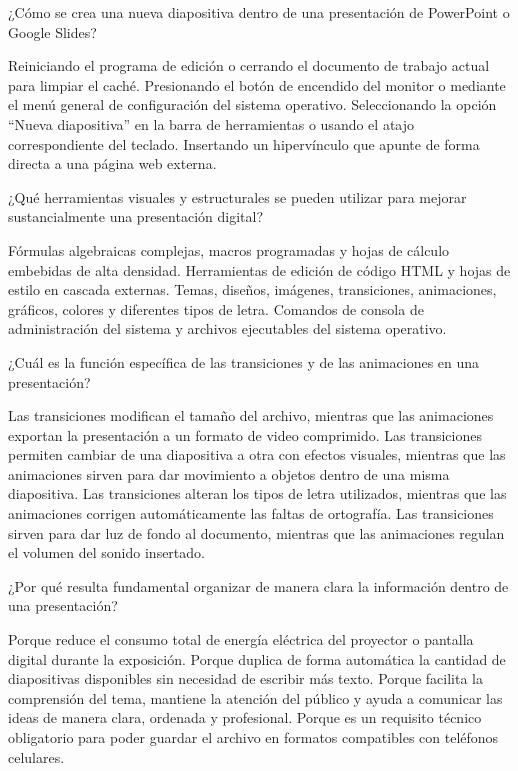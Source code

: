 \documentclass[12pt]{evaluasep}
\begin{document}
\begin{questions}
    \question ¿Cómo se crea una nueva diapositiva dentro de una presentación de PowerPoint o Google Slides?
    \begin{choices}
        \choice Reiniciando el programa de edición o cerrando el documento de trabajo actual para limpiar el caché.
        \choice Presionando el botón de encendido del monitor o mediante el menú general de configuración del sistema operativo.
        \CorrectChoice Seleccionando la opción ``Nueva diapositiva'' en la barra de herramientas o usando el atajo correspondiente del teclado.
        \choice Insertando un hipervínculo que apunte de forma directa a una página web externa.
    \end{choices}

        \newpage

    \question ¿Qué herramientas visuales y estructurales se pueden utilizar para mejorar sustancialmente una presentación digital?
    \begin{choices}
        \choice Fórmulas algebraicas complejas, macros programadas y hojas de cálculo embebidas de alta densidad.
        \choice Herramientas de edición de código HTML y hojas de estilo en cascada externas.
        \CorrectChoice Temas, diseños, imágenes, transiciones, animaciones, gráficos, colores y diferentes tipos de letra.
        \choice Comandos de consola de administración del sistema y archivos ejecutables del sistema operativo.
    \end{choices}

    \question ¿Cuál es la función específica de las transiciones y de las animaciones en una presentación?
    \begin{choices}
        \choice Las transiciones modifican el tamaño del archivo, mientras que las animaciones exportan la presentación a un formato de video comprimido.
        \CorrectChoice Las transiciones permiten cambiar de una diapositiva a otra con efectos visuales, mientras que las animaciones sirven para dar movimiento a objetos dentro de una misma diapositiva.
        \choice Las transiciones alteran los tipos de letra utilizados, mientras que las animaciones corrigen automáticamente las faltas de ortografía.
        \choice Las transiciones sirven para dar luz de fondo al documento, mientras que las animaciones regulan el volumen del sonido insertado.
    \end{choices}

    \question ¿Por qué resulta fundamental organizar de manera clara la información dentro de una presentación?
    \begin{choices}
        \choice Porque reduce el consumo total de energía eléctrica del proyector o pantalla digital durante la exposición.
        \choice Porque duplica de forma automática la cantidad de diapositivas disponibles sin necesidad de escribir más texto.
        \CorrectChoice Porque facilita la comprensión del tema, mantiene la atención del público y ayuda a comunicar las ideas de manera clara, ordenada y profesional.
        \choice Porque es un requisito técnico obligatorio para poder guardar el archivo en formatos compatibles con teléfonos celulares.
    \end{choices}


\end{questions}
\end{document}
